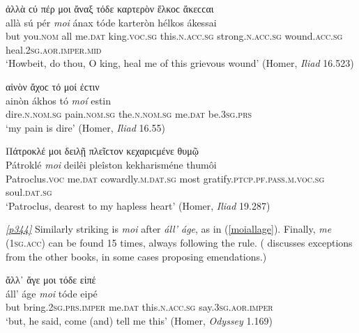 \begin{exe}
\ex ἀλλὰ ϲύ πέρ {μοι} ἄναξ τόδε καρτερὸν ἕλκοϲ ἄκεϲϲαι\\
\gll allà sú pér \emph{moi} ánax tóde karteròn hélkos ákessai\\
but you.\textsc{nom} all me.\textsc{dat} king.\textsc{voc.sg} this.\textsc{n.acc.sg} strong.\textsc{n.acc.sg} wound.\textsc{acc.sg} heal.\textsc{2sg.aor.imper.mid}\\
\trans `Howbeit, do thou, O king, heal me of this grievous wound' (Homer, \textit{Iliad} 16.523)
\label{moipron4}
\end{exe}

\begin{exe}
\ex αἰνὸν ἄχοϲ τό {μοί} ἐϲτιν\\
\gll ainòn ákhos tó \emph{moí} estin\\
dire.\textsc{n.nom.sg} pain.\textsc{nom.sg} the.\textsc{n.nom.sg} me.\textsc{dat} be.\textsc{3sg.prs}\\
\trans `my pain is dire' (Homer, \textit{Iliad} 16.55)
\label{moipron5}
\end{exe}

\begin{exe}
\ex Πάτροκλέ {μοι} δειλῇ πλεῖϲτον κεχαριϲμένε θυμῷ\\
\gll Pátroklé \emph{moi} deilêi pleîston kekharisméne thumôi\\
Patroclus.\textsc{voc} me.\textsc{dat} cowardly.\textsc{m.dat.sg} most gratify.\textsc{ptcp.pf.pass.m.voc.sg} soul.\textsc{dat.sg}\\
\trans `Patroclus, dearest to my hapless heart' (Homer, \textit{Iliad} 19.287)
\label{patrokle}
\end{exe}

\hyperlink{p344}{\emph{[p344]}} Similarly striking is \textit{moi} after \textit{áll' áge}, as in (\ref{moiallage}). Finally, \textit{me} (\textsc{1sg.acc}) can be found 15 times, always following the rule. (\citealp[336ff.]{Monro1891} discusses exceptions from the other books, in some cases proposing emendations.)

\begin{exe}
\ex ἄλλ᾽ ἄγε {μοι} τόδε εἰπέ\\
\gll áll' áge \emph{moi} tóde eipé\\
but bring.\textsc{2sg.prs.imper} me.\textsc{dat} this.\textsc{n.acc.sg} say.\textsc{3sg.aor.imper}\\
\trans `but, he said, come (and) tell me this' (Homer, \textit{Odyssey} 1.169)
\label{moiallage}
\end{exe}

